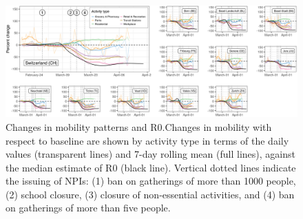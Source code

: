 \begin{figure}\centering
  \includegraphics[width=\textwidth]{fig_covid-switzerland-npi/FIGURE_3.png}
  \caption[Changes in mobility patterns and R0.]{Changes in mobility patterns and R0.Changes in mobility with respect to baseline are shown by activity type in terms of the daily values (transparent lines) and 7-day rolling mean (full lines), against the median estimate of R0 (black line). Vertical dotted lines indicate the issuing of NPIs: (1) ban on gatherings of more than 1000 people, (2) school closure, (3) closure of non-essential activities, and (4) ban on gatherings of more than five people.}
  \label{fig:covid-ch-mobility}
\end{figure}

